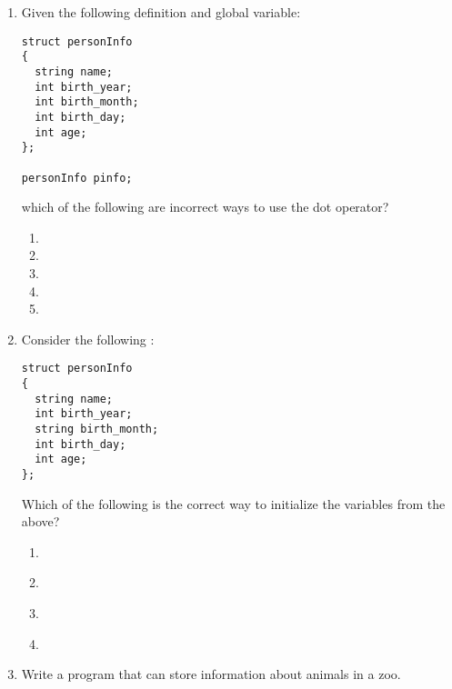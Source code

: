 \begin{enumerate}
\item Given the following  definition and global variable:

\noindent\begin{minipage}{\linewidth}\begin{lstlisting}
struct personInfo
{
  string name;
  int birth_year;
  int birth_month;
  int birth_day;
  int age;
};

personInfo pinfo;
\end{lstlisting}\end{minipage}

\noindent which of the following are incorrect ways to use the dot operator?
  \begin{enumerate}
	\item {}
	\item {}
	\item {}
  \item {}
	\item {}
  \end{enumerate}

\item Consider the following :

\noindent\begin{minipage}{\linewidth}\begin{lstlisting}
struct personInfo
{
  string name;
  int birth_year;
  string birth_month;
  int birth_day;
  int age;
};
\end{lstlisting}\end{minipage}

Which of the following is the correct way to initialize the variables from the  above?

  \begin{enumerate}
	\item {\tiny {}}
	\item {\tiny {} }
	\item {\tiny {}}
	\item {\tiny {} }
  \end{enumerate}

\item Write a program that can store information about animals in a zoo.


\end{enumerate}
